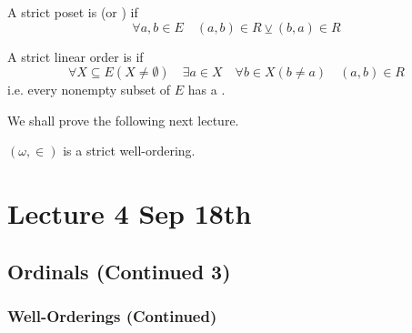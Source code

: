 \documentclass[notoc,notitlepage]{tufte-book}
\begin{document}
\begin{defn}
\label{defn:strict_totally_ordered_set}
  A strict poset is  (or ) if
  \begin{equation*}
    \forall a, b \in E \quad (a, b) \in R \veebar (b, a) \in R
  \end{equation*}
\end{defn}

\begin{defn}
\label{defn:well_order}
  A strict linear order is  if
  \begin{equation*}
    \forall X \subseteq E ( X \neq \emptyset ) \quad \exists a \in X \quad \forall b \in X ( b \neq a ) \quad (a, b) \in R
  \end{equation*}
  i.e. every nonempty subset of $E$ has a .
\end{defn}

We shall prove the following next lecture.

\begin{propononum}
\label{propo:_omega_is_strictly_well_ordered}
  $(\omega, \in)$ is a strict well-ordering.
\end{propononum}




\chapter{Lecture 4 Sep 18th}%
\label{chp:lecture_4_sep_18th}

\section{Ordinals (Continued 3)}%
\label{sec:ordinals_continued_3}

\subsection{Well-Orderings (Continued)}%
\label{sub:well_orderings_continued}
\end{document}
